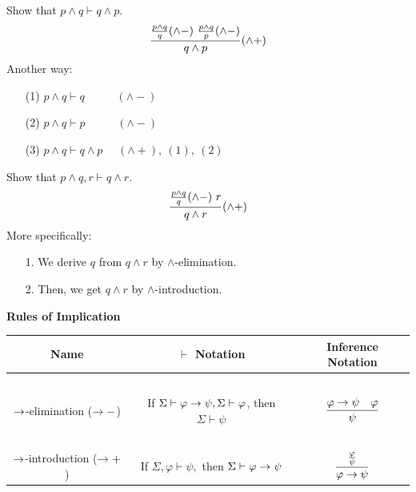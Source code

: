 \documentclass[english, 11pt]{article}
\begin{document}
\begin{defn}
    \begin{exmp} Show that $p \land q \vdash q \land p$.
      \[ \frac{\frac{p \land q}{q} (\land -) \ \frac{p \land q}{p} (\land -)}{q \land p}(\land +) \]
      Another way:
      \begin{itemize}
        \item[(1)] $p \land q \vdash q$ \ \ \ \ \ $(\land -)$
        \item[(2)] $p \land q \vdash p$ \ \ \ \ \ $(\land -)$
        \item[(3)] $p \land q \vdash q \land p$  \ \ $(\land +), \ (1), \ (2)$
      \end{itemize}
    \end{exmp}

    \begin{exmp}
      Show that $p \land q, r \vdash q \land r$.
      \[ \frac{\frac{p \land q}{q} (\land-) \ r}{q \land r}(\land+) \]
      More specifically:
      \begin{itemize}
        \item[1.] We derive $q$ from $q \land r$ by $\land$-elimination.
        \item[2.] Then, we get $q \land r$ by $\land$-introduction.
      \end{itemize}
    \end{exmp}

    \begin{center}\textbf{Rules of Implication}\end{center}
    \begin{center}
    \begin{tabular}{c | c | c }
      Name & $\vdash$ Notation & Inference Notation \\
      \hline
      \hline
      \ &&\\
      $\rightarrow$-elimination ($\rightarrow-$) & If $\Sigma \vdash \varphi \rightarrow \psi, \Sigma \vdash \varphi$, then $\Sigma \vdash \psi $ & $\displaystyle \frac{\varphi \rightarrow \psi \ \ \ \varphi}{\psi}$ \\[3ex]
      \hline
      \hline
      \ &&\\
      $\rightarrow$-introduction ($\rightarrow+$) & If $\Sigma, \varphi \vdash \psi,$ then $\Sigma \vdash \varphi \rightarrow \psi$ & $\displaystyle \frac{\frac{\varphi}{\psi}}{\varphi \rightarrow \psi}$ \\[3ex]
      \hline
      \hline
    \end{tabular}
    \end{center}


\end{defn}
\end{document}
